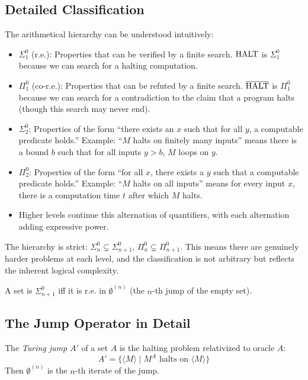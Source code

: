 \subsection*{Detailed Classification}

The arithmetical hierarchy can be understood intuitively:

\begin{itemize}
\item $\Sigma^0_1$ (r.e.): Properties that can be verified by a finite search. $\text{HALT}$ is $\Sigma^0_1$ because we can search for a halting computation.
\item $\Pi^0_1$ (co-r.e.): Properties that can be refuted by a finite search. $\overline{\text{HALT}}$ is $\Pi^0_1$ because we can search for a contradiction to the claim that a program halts (though this search may never end).
\item $\Sigma^0_2$: Properties of the form ``there exists an $x$ such that for all $y$, a computable predicate holds.'' Example: ``$M$ halts on finitely many inputs'' means there is a bound $b$ such that for all inputs $y > b$, $M$ loops on $y$.
\item $\Pi^0_2$: Properties of the form ``for all $x$, there exists a $y$ such that a computable predicate holds.'' Example: ``$M$ halts on all inputs'' means for every input $x$, there is a computation time $t$ after which $M$ halts.
\item Higher levels continue this alternation of quantifiers, with each alternation adding expressive power.
\end{itemize}

The hierarchy is strict: $\Sigma^0_n \subsetneq \Sigma^0_{n+1}$, $\Pi^0_n \subsetneq \Pi^0_{n+1}$. This means there are genuinely harder problems at each level, and the classification is not arbitrary but reflects the inherent logical complexity.

\begin{theorem}
A set is $\Sigma^0_{n+1}$ iff it is r.e. in $\emptyset^{(n)}$ (the $n$-th jump of the empty set).
\end{theorem}

\subsection*{The Jump Operator in Detail}

The \emph{Turing jump} $A'$ of a set $A$ is the halting problem relativized to oracle $A$:
\[
A' = \{ \langle M \rangle \mid M^A \text{ halts on } \langle M \rangle \}
\]
Then $\emptyset^{(n)}$ is the $n$-th iterate of the jump.

